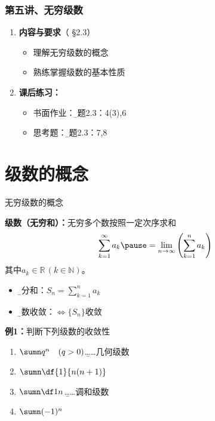 \begin{frame}
	\frametitle{第五讲、无穷级数}
	\linespread{1.5}
	\begin{enumerate}
	  \item {\bf 内容与要求}{\color{blue}（ \S2.3）}
	  \begin{itemize}
 	    \item 理解无穷级数的概念
 	    \item 熟练掌握级数的基本性质
	  \vspace{1em}
	  \end{itemize}
	  \item {\bf 课后练习：}
	  \begin{itemize}
	    \item 书面作业：{\b 习题2.3：4(3),6}
	    \item 思考题：{\b 习题2.3：7,8}
	  \end{itemize}
	\end{enumerate}
\end{frame}

\section{级数的概念}

\begin{frame}{无穷级数的概念}
	\linespread{1.2}\pause 
	\begin{block}{{\bf 级数\pause （无穷和）：}\pause 无穷多个数按照一定次序求和\hfill}
	$$\sum\limits_{k=1}^{\infty}a_k\pause
	=\lim_{n\to\infty}\left(\sum_{k=1}^na_k\right)$$ \pause 
	其中$a_k\in\mathbb{R}\,(k\in\mathbb{N})$。
	\end{block}\pause 
	\begin{itemize}
	  \item {\b 部分和：}$S_n=\sum\limits_{k=1}^na_k$\pause 
	  \item {\b 级数收敛：}$\Leftrightarrow\{S_n\}$收敛
	\end{itemize}
\end{frame}

\begin{frame}
	\linespread{1.5}
	\begin{exampleblock}{{\bf 例1：}判断下列级数的收敛性\hfill}\pause 
		\begin{enumerate}
		  \item $\sumn q^n\quad (q>0)$\pause \hfill{\b \ldots\ldots 几何级数}\pause 
		  \item $\sumn\df{1}{n(n+1)}$\pause 
		  \item $\sumn\df 1n$\pause \hfill{\b \ldots\ldots 调和级数}\pause 
		  \item $\sumn (-1)^n$
		\end{enumerate}
	\end{exampleblock}
\end{frame}

